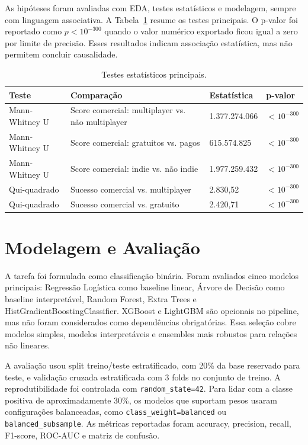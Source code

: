 \documentclass[12pt]{article}
\begin{document}
As hipóteses foram avaliadas com EDA, testes estatísticos e modelagem, sempre com linguagem associativa. A Tabela~\ref{tab:testes} resume os testes principais. O p-valor foi reportado como \(p < 10^{-300}\) quando o valor numérico exportado ficou igual a zero por limite de precisão. Esses resultados indicam associação estatística, mas não permitem concluir causalidade.

\begin{table}[ht]
\centering
\caption{Testes estatísticos principais.}
\label{tab:testes}
\scriptsize
\begin{tabular}{p{}p{}p{}p{}}
\toprule
Teste & Comparação & Estatística & p-valor \\
\midrule
Mann-Whitney U & Score comercial: multiplayer vs. não multiplayer & 1.377.274.066 & $<10^{-300}$ \\
Mann-Whitney U & Score comercial: gratuitos vs. pagos & 615.574.825 & $<10^{-300}$ \\
Mann-Whitney U & Score comercial: indie vs. não indie & 1.977.259.432 & $<10^{-300}$ \\
Qui-quadrado & Sucesso comercial vs. multiplayer & 2.830,52 & $<10^{-300}$ \\
Qui-quadrado & Sucesso comercial vs. gratuito & 2.420,71 & $<10^{-300}$ \\
\bottomrule
\end{tabular}
\end{table}

\section{Modelagem e Avaliação}

A tarefa foi formulada como classificação binária. Foram avaliados cinco modelos principais: Regressão Logística como baseline linear, Árvore de Decisão como baseline interpretável, Random Forest, Extra Trees e HistGradientBoostingClassifier. XGBoost e LightGBM são opcionais no pipeline, mas não foram considerados como dependências obrigatórias. Essa seleção cobre modelos simples, modelos interpretáveis e ensembles mais robustos para relações não lineares.

A avaliação usou split treino/teste estratificado, com 20\% da base reservado para teste, e validação cruzada estratificada com 3 folds no conjunto de treino. A reprodutibilidade foi controlada com \texttt{random\_state=42}. Para lidar com a classe positiva de aproximadamente 30\%, os modelos que suportam pesos usaram configurações balanceadas, como \texttt{class\_weight=balanced} ou \texttt{balanced\_subsample}. As métricas reportadas foram accuracy, precision, recall, F1-score, ROC-AUC e matriz de confusão.
\end{document}
